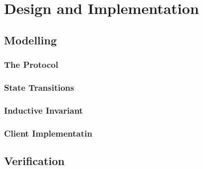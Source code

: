 \chapter{Design and Implementation}

\newpage

\section{Modelling}

\subsection{The Protocol}

\subsection{State Transitions}

\subsection{Inductive Invariant}

\subsection{Client Implementatin}

\section{Verification}
